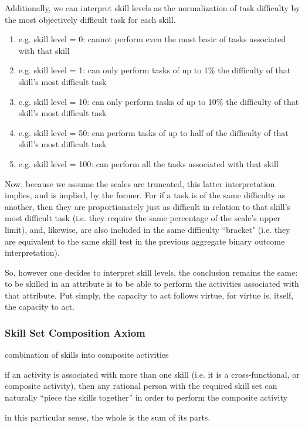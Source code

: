 \documentclass{elsarticle} %
\begin{document}
Additionally, we can interpret skill levels as the normalization of task
difficulty by the most objectively difficult task for each skill.
\begin{enumerate}
    \item e.g. skill level = 0: cannot perform even the most basic of tasks associated
          with that skill
    \item e.g. skill level = 1: can only perform tasks of up to 1\% the difficulty of
          that skill's most difficult task
    \item e.g. skill level = 10: can only perform tasks of up to 10\% the difficulty of
          that skill's most difficult task
    \item e.g. skill level = 50: can perform tasks of up to half of the difficulty of
          that skill's most difficult task
    \item e.g. skill level = 100: can perform all the tasks associated with that skill
\end{enumerate}

Now, because we assume the scales are truncated, this latter interpretation
implies, and is implied, by the former. For if a task is of the same difficulty
as another, then they are proportionately just as difficult in relation to that
skill's most difficult task (i.e. they require the same percentage of the
scale's upper limit), and, likewise, are also included in the same difficulty
``bracket" (i.e. they are equivalent to the same skill test in the previous
aggregate binary outcome interpretation).

So, however one decides to interpret skill levels, the conclusion remains the
same: to be skilled in an attribute is to be able to perform the activities
associated with that attribute. Put simply, the capacity to act follows virtue,
for virtue is, itself, the capacity to act.

\subsubsection{Skill Set Composition Axiom}
combination of skills into composite activities

if an activity is associated with more than one skill (i.e. it is a
cross-functional, or composite activity), then any rational person with the
required skill set can naturally ``piece the skills together'' in order to
perform the composite activity

in this particular sense, the whole is the sum of its parts.
\end{document}
